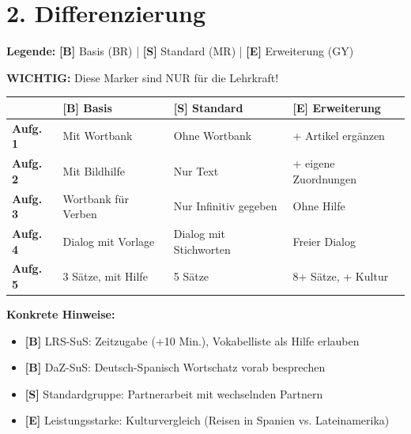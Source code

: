 \documentclass[11pt, a4paper]{article}
\newcommand{\B}{\textcolor{basis}{\textbf{[B]}}}
\newcommand{\Std}{\textcolor{standard}{\textbf{[S]}}}
\newcommand{\E}{\textcolor{erweiterung}{\textbf{[E]}}}
\begin{document}

\section*{2. Differenzierung}

\begin{differenzierung}
\textbf{Legende:} \B{} Basis (BR) | \Std{} Standard (MR) | \E{} Erweiterung (GY)

\vspace{0.5em}
\textbf{WICHTIG:} Diese Marker sind NUR für die Lehrkraft!
\end{differenzierung}

\vspace{1em}

\begin{tabularx}{\textwidth}{|l|X|X|X|}
\hline
& \B{} \textbf{Basis} & \Std{} \textbf{Standard} & \E{} \textbf{Erweiterung} \\
\hline
\textbf{Aufg. 1} & Mit Wortbank & Ohne Wortbank & + Artikel ergänzen \\
\hline
\textbf{Aufg. 2} & Mit Bildhilfe & Nur Text & + eigene Zuordnungen \\
\hline
\textbf{Aufg. 3} & Wortbank für Verben & Nur Infinitiv gegeben & Ohne Hilfe \\
\hline
\textbf{Aufg. 4} & Dialog mit Vorlage & Dialog mit Stichworten & Freier Dialog \\
\hline
\textbf{Aufg. 5} & 3 Sätze, mit Hilfe & 5 Sätze & 8+ Sätze, + Kultur \\
\hline
\end{tabularx}

\vspace{1em}

\textbf{Konkrete Hinweise:}
\begin{itemize}
    \item \B{} LRS-SuS: Zeitzugabe (+10 Min.), Vokabelliste als Hilfe erlauben
    \item \B{} DaZ-SuS: Deutsch-Spanisch Wortschatz vorab besprechen
    \item \Std{} Standardgruppe: Partnerarbeit mit wechselnden Partnern
    \item \E{} Leistungsstarke: Kulturvergleich (Reisen in Spanien vs. Lateinamerika)
\end{itemize}

\end{document}
